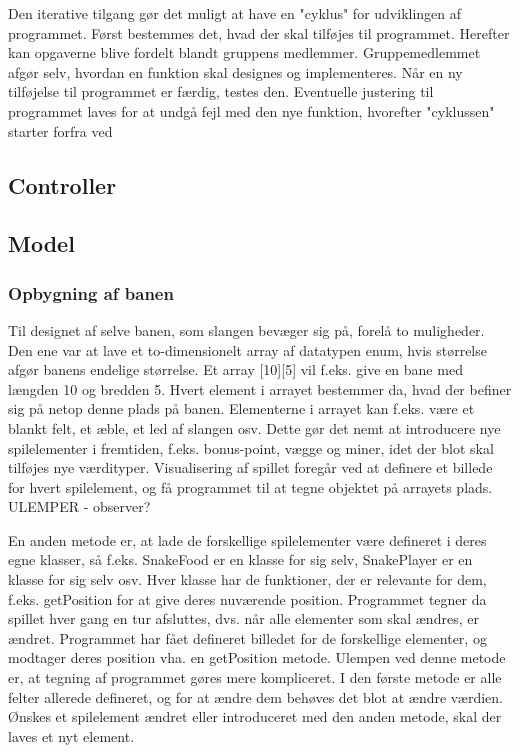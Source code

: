 \documentclass{report}
\begin{document}
Den iterative tilgang gør det muligt at have en "cyklus" for udviklingen af programmet. Først bestemmes det, hvad der skal tilføjes til programmet. Herefter kan opgaverne blive fordelt blandt gruppens medlemmer. Gruppemedlemmet afgør selv, hvordan en funktion skal designes og implementeres. Når en ny tilføjelse til programmet er færdig, testes den. Eventuelle justering til programmet laves for at undgå fejl med den nye funktion, hvorefter "cyklussen" starter forfra ved
\subsection{Controller}
	
\subsection{Model}

\subsubsection{Opbygning af banen}
Til designet af selve banen, som slangen bevæger sig på, forelå to muligheder. Den ene var at lave et to-dimensionelt array af datatypen enum, hvis størrelse afgør banens endelige størrelse. Et array [10][5] vil f.eks. give en bane med længden 10 og bredden 5. Hvert element i arrayet bestemmer da, hvad der befiner sig på netop denne plads på banen. Elementerne i arrayet kan f.eks. være et blankt felt, et æble, et led af slangen osv. Dette gør det nemt at introducere nye spilelementer i fremtiden, f.eks. bonus-point, vægge og miner, idet der blot skal tilføjes nye værdityper. Visualisering af spillet foregår ved at definere et billede for hvert spilelement, og få programmet til at tegne objektet på arrayets plads.
ULEMPER - observer?

En anden metode er, at lade de forskellige spilelementer være defineret i deres egne klasser, så f.eks. SnakeFood er en klasse for sig selv, SnakePlayer er en klasse for sig selv osv. Hver klasse har de funktioner, der er relevante for dem, f.eks. getPosition for at give deres nuværende position. Programmet tegner da spillet hver gang en tur afsluttes, dvs. når alle elementer som skal ændres, er ændret. Programmet har fået defineret billedet for de forskellige elementer, og modtager deres position vha. en getPosition metode.
 Ulempen ved denne metode er, at tegning af programmet gøres mere kompliceret. I den første metode er alle felter allerede defineret, og for at ændre dem behøves det blot at ændre værdien. Ønskes et spilelement ændret eller introduceret med den anden metode, skal der laves et nyt element.
 
\end{document}
